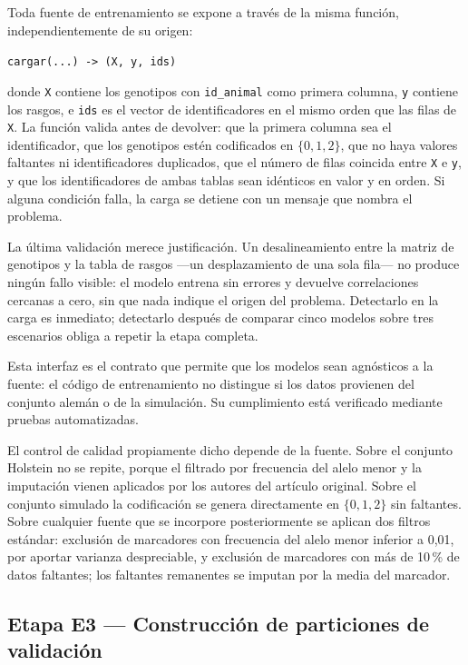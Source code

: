 \documentclass[conference]{IEEEtran}
\begin{document}
Toda fuente de entrenamiento se expone a través de la misma función,
independientemente de su origen:

\begin{center}
\texttt{cargar(...) -> (X, y, ids)}
\end{center}

donde \texttt{X} contiene los genotipos con \texttt{id\_animal} como
primera columna, \texttt{y} contiene los rasgos, e \texttt{ids} es el
vector de identificadores en el mismo orden que las filas de \texttt{X}.
La función valida antes de devolver: que la primera columna sea el
identificador, que los genotipos estén codificados en $\{0, 1, 2\}$, que
no haya valores faltantes ni identificadores duplicados, que el número de
filas coincida entre \texttt{X} e \texttt{y}, y que los identificadores de
ambas tablas sean idénticos en valor y en orden. Si alguna condición
falla, la carga se detiene con un mensaje que nombra el problema.

La última validación merece justificación. Un desalineamiento entre la
matriz de genotipos y la tabla de rasgos —un desplazamiento de una sola
fila— no produce ningún fallo visible: el modelo entrena sin errores y
devuelve correlaciones cercanas a cero, sin que nada indique el origen del
problema. Detectarlo en la carga es inmediato; detectarlo después de
comparar cinco modelos sobre tres escenarios obliga a repetir la etapa
completa.

Esta interfaz es el contrato que permite que los modelos sean agnósticos a
la fuente: el código de entrenamiento no distingue si los datos provienen
del conjunto alemán o de la simulación. Su cumplimiento está verificado
mediante pruebas automatizadas.

El control de calidad propiamente dicho depende de la fuente. Sobre el
conjunto Holstein no se repite, porque el filtrado por frecuencia del
alelo menor y la imputación vienen aplicados por los autores del artículo
original. Sobre el conjunto simulado la codificación se genera
directamente en $\{0, 1, 2\}$ sin faltantes. Sobre cualquier fuente que se
incorpore posteriormente se aplican dos filtros estándar: exclusión de
marcadores con frecuencia del alelo menor inferior a 0{,}01, por aportar
varianza despreciable, y exclusión de marcadores con más de 10\,\% de
datos faltantes; los faltantes remanentes se imputan por la media del
marcador.

\subsection{Etapa E3 — Construcción de particiones de validación}
\end{document}
